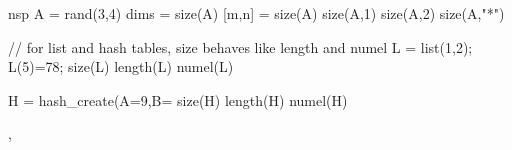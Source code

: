 \begin{examples}
\begin{mintednsp}{nsp}
A = rand(3,4)
dims = size(A)
[m,n] = size(A)
size(A,1)
size(A,2)
size(A,"*")

// for list and hash tables, size behaves like length and numel
L = list(1,2); L(5)=78; 
size(L)
length(L)
numel(L)

H = hash_create(A=9,B=%
size(H)
length(H)
numel(H)
\end{mintednsp}
\end{examples}

\begin{manseealso}
  ,  
\end{manseealso}

